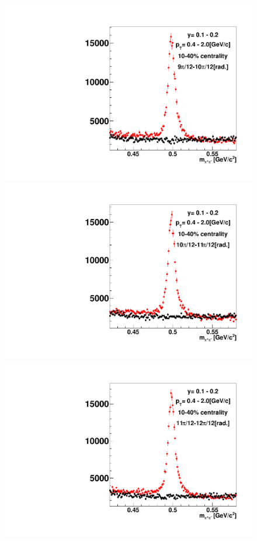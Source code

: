 \begin{figure}[h]
\includegraphics[width=0.14\linewidth]{chapterX/fig/ks_v1_sig/kf_ptslice0_cent1_ks_flow_phi10_rap3_check.pdf}
\includegraphics[width=0.14\linewidth]{chapterX/fig/ks_v1_sig/kf_ptslice0_cent1_ks_flow_phi11_rap3_check.pdf}
\includegraphics[width=0.14\linewidth]{chapterX/fig/ks_v1_sig/kf_ptslice0_cent1_ks_flow_phi12_rap3_check.pdf}


\end{figure}
